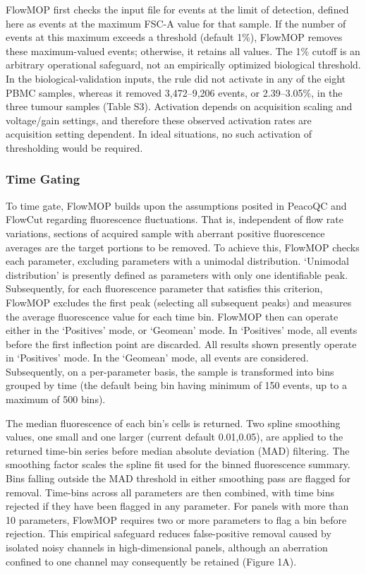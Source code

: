 \documentclass[ASNA]{latex/wiley/USG}
\begin{document}
FlowMOP first checks the input file for events at the limit of
detection, defined here as events at the maximum FSC-A value for that
sample. If the number of events at this maximum exceeds a threshold
(default 1\%), FlowMOP removes these maximum-valued events; otherwise,
it retains all values. The 1\% cutoff is an arbitrary operational
safeguard, not an empirically optimized biological threshold. In the
biological-validation inputs, the rule did not activate in any of the
eight PBMC samples, whereas it removed 3,472--9,206 events, or
2.39--3.05\%, in the three tumour samples (Table S3). Activation depends
on acquisition scaling and voltage/gain settings, and therefore these
observed activation rates are acquisition setting dependent. In ideal
situations, no such activation of thresholding would be required.

\subsubsection{Time Gating}\label{time-gating}

To time gate, FlowMOP builds upon the assumptions posited in PeacoQC and
FlowCut regarding fluorescence fluctuations. That is, independent of
flow rate variations, sections of acquired sample with aberrant positive
fluorescence averages are the target portions to be removed. To achieve
this, FlowMOP checks each parameter, excluding parameters with a
unimodal distribution. `Unimodal distribution' is presently defined as
parameters with only one identifiable peak. Subsequently, for each
fluorescence parameter that satisfies this criterion, FlowMOP excludes
the first peak (selecting all subsequent peaks) and measures the average
fluorescence value for each time bin. FlowMOP then can operate either in
the `Positives' mode, or `Geomean' mode. In `Positives' mode, all events
before the first inflection point are discarded. All results shown
presently operate in `Positives' mode. In the `Geomean' mode, all events
are considered. Subsequently, on a per-parameter basis, the sample is
transformed into bins grouped by time (the default being bin having
minimum of 150 events, up to a maximum of 500 bins).

The median fluorescence of each bin's cells is returned. Two spline
smoothing values, one small and one larger (current default 0.01,0.05),
are applied to the returned time-bin series before median absolute
deviation (MAD) filtering. The smoothing factor scales the spline fit
used for the binned fluorescence summary. Bins falling outside the MAD
threshold in either smoothing pass are flagged for removal. Time-bins
across all parameters are then combined, with time bins rejected if they
have been flagged in any parameter. For panels with more than 10
parameters, FlowMOP requires two or more parameters to flag a bin before
rejection. This empirical safeguard reduces false-positive removal
caused by isolated noisy channels in high-dimensional panels, although
an aberration confined to one channel may consequently be retained
(Figure 1A).
\end{document}
